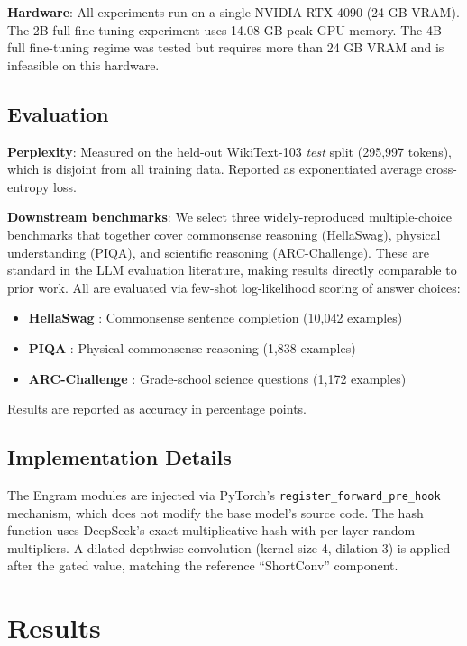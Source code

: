 \documentclass{article}
\begin{document}
\textbf{Hardware}: All experiments run on a single NVIDIA RTX 4090 (24 GB VRAM). The 2B full fine-tuning experiment uses 14.08 GB peak GPU memory. The 4B full fine-tuning regime was tested but requires more than 24 GB VRAM and is infeasible on this hardware.

\subsection{Evaluation}

\textbf{Perplexity}: Measured on the held-out WikiText-103 \emph{test} split (295,997 tokens), which is disjoint from all training data. Reported as exponentiated average cross-entropy loss.

\textbf{Downstream benchmarks}: We select three widely-reproduced multiple-choice benchmarks that together cover commonsense reasoning (HellaSwag), physical understanding (PIQA), and scientific reasoning (ARC-Challenge). These are standard in the LLM evaluation literature, making results directly comparable to prior work. All are evaluated via few-shot log-likelihood scoring of answer choices:
\begin{itemize}[nosep]
    \item \textbf{HellaSwag} \cite{zellers2019hellaswag}: Commonsense sentence completion (10,042 examples)
    \item \textbf{PIQA} \cite{bisk2020piqa}: Physical commonsense reasoning (1,838 examples)
    \item \textbf{ARC-Challenge} \cite{clark2018think}: Grade-school science questions (1,172 examples)
\end{itemize}

Results are reported as accuracy in percentage points.

\subsection{Implementation Details}

The Engram modules are injected via PyTorch's \texttt{register\_forward\_pre\_hook} mechanism, which does not modify the base model's source code. The hash function uses DeepSeek's exact multiplicative hash with per-layer random multipliers. A dilated depthwise convolution (kernel size 4, dilation 3) is applied after the gated value, matching the reference ``ShortConv'' component.

\section{Results}
\end{document}
